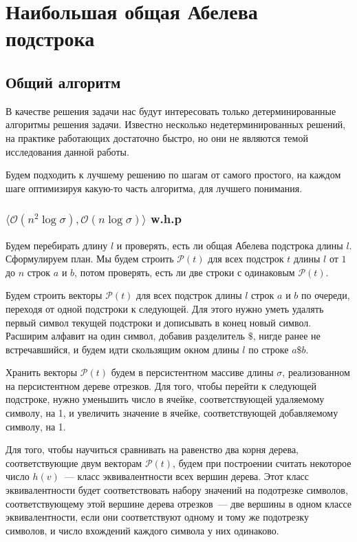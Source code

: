 \section{Наибольшая общая Абелева подстрока}

\subsection{Общий алгоритм}

В качестве решения задачи нас будут интересовать только детерминированные алгоритмы решения задачи. Известно несколько недетерминированных решений, на практике работающих достаточно быстро, но они не являются темой исследования данной работы.

Будем подходить к лучшему решению по шагам от самого простого, на каждом шаге оптимизируя какую-то часть алгоритма, для лучшего понимания.

\subsubsection{$\langle \mathcal{O}(n^2 \log \sigma), \mathcal{O}(n \log \sigma) \rangle$ w.h.p}

Будем перебирать длину $l$ и проверять, есть ли общая Абелева подстрока длины $l$.
Сформулируем план. Мы будем строить $\mathcal{P}(t)$ для всех подстрок $t$ длины $l$ от $1$ до $n$ строк $a$ и $b$, потом проверять, есть ли две строки с одинаковым $\mathcal{P}(t)$.

Будем строить векторы $\mathcal{P}(t)$ для всех подстрок длины $l$ строк $a$ и $b$ по очереди, переходя от одной подстроки к следующей. Для этого нужно уметь удалять первый символ текущей подстроки и дописывать в конец новый символ. Расширим алфавит на один символ, добавив разделитель $\$$, нигде ранее не встречавшийся, и будем идти скользящим окном длины $l$ по строке $a\$b$.

Хранить векторы $\mathcal{P}(t)$ будем в персистентном массиве длины $\sigma$, реализованном на персистентном дереве отрезков. Для того, чтобы перейти к следующей подстроке, нужно уменьшить число в ячейке, соответствующей удаляемому символу, на 1, и увеличить значение в ячейке, соответствующей добавляемому символу, на 1.

Для того, чтобы научиться сравнивать на равенство два корня дерева, соответствующие двум векторам $\mathcal{P}(t)$, будем при построении считать некоторое число $h(v)$~--- класс эквивалентности всех вершин дерева. Этот класс эквивалентности будет соответствовать набору значений на подотрезке символов, соответствующему этой вершине дерева отрезков~--- две вершины в одном классе эквивалентности, если они соответствуют одному и тому же подотрезку символов, и число вхождений каждого символа у них одинаково.

